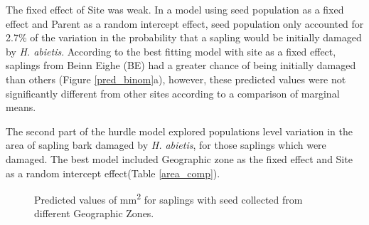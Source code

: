 \documentclass[a4paper, 11pt]{article}
\begin{document}


The fixed effect of Site was weak. In a model using seed population as a fixed effect and Parent as a random intercept effect, seed population only accounted for 2.7\% of the variation in the probability that a sapling would be initially damaged by \textit{H. abietis}. According to the best fitting model with site as a fixed effect, saplings from Beinn Eighe (BE) had a greater chance of being initially damaged than others (Figure \ref{pred_binom}a), however, these predicted values were not significantly different from other sites according to a comparison of marginal means.

The second part of the hurdle model explored populations level variation in the area of sapling bark damaged by \textit{H. abietis}, for those saplings which were damaged. The best model included Geographic zone as the fixed effect and Site as a random intercept effect(Table \ref{area_comp}).

\begin{figure}[H]
\centering
	\caption{Predicted values of mm\textsuperscript{2} for saplings with seed collected from different Geographic Zones.}
	\label{}
\end{figure}
\end{document}
